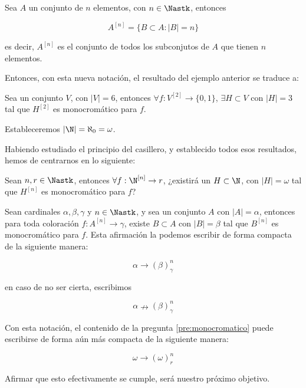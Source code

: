 \begin{notn}
    Sea $A$ un conjunto de $n$ elementos, con $n \in \Nastk$, entonces
    
    \[
    A^{[n]} = \{ B \subset A : |B| = n \}
    \]
    
    \noindent es decir, $A^{[n]}$ es el conjunto de todos los subconjutos de $A$ que tienen $n$ elementos.
\end{notn}

Entonces, con esta nueva notación, el resultado del ejemplo anterior se traduce a:

\begin{pro}
    Sea un conjunto $V$, con $|V| = 6$, entonces $\forall f: V^{[2]} \rightarrow \{0,1\}$, $\exists H \subset V$ con $|H| = 3$ tal que $H^{[2]}$ es monocromático para $f$.
\end{pro}

\begin{notn}
    Estableceremos $|\N| = \aleph_0 = \omega$.
\end{notn}

Habiendo estudiado el principio del casillero, y establecido todos esos resultados, hemos de centrarnos en lo siguiente:

\begin{pre}\label{pre:monocromatico}
    Sean $n, r \in \Nastk$, entonces $\forall f: \N^{[n]} \rightarrow r$, ¿existirá un $H \subset \N$, con $|H| = \omega$ tal que $H^{[n]}$ es monocromático para $f$?
\end{pre}

\begin{notn}\label{notn:notn1}
    Sean cardinales $\alpha, \beta, \gamma$ y $n \in \Nastk$, y sea un conjunto $A$ con $|A| = \alpha$, entonces para toda coloración $f: A^{[n]} \rightarrow \gamma$, existe $B \subset A$ con $|B| = \beta$ tal que $B^{[n]}$ es monocromático para $f$. Esta afirmación la podemos escribir de forma compacta de la siguiente manera:
    
    \[
    \alpha \rightarrow (\beta)_{\gamma}^n
    \]
    
    \noindent en caso de no ser cierta, escribimos
    
    \[
    \alpha \nrightarrow (\beta)_{\gamma}^n
    \]
\end{notn}

Con esta notación, el contenido de la pregunta \ref{pre:monocromatico} puede escribirse de forma aún más compacta de la siguiente manera:
    
\[
\omega \rightarrow (\omega)_r^n
\]

Afirmar que esto efectivamente se cumple, será nuestro próximo objetivo.
